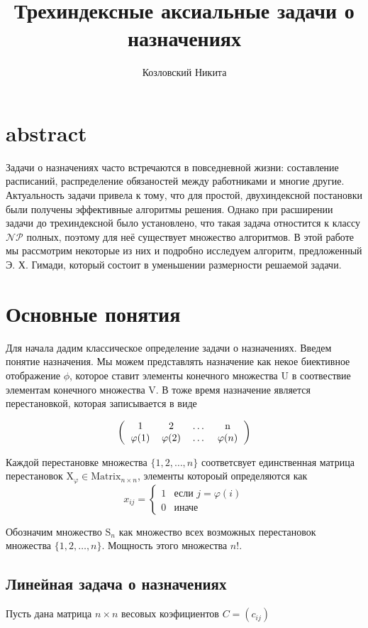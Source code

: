 \documentclass[10pt,a4paper]{article}
\author{Козловский Никита}
\title{Трехиндексные аксиальные задачи о назначениях}
\begin{document}
\section{abstract}
Задачи о назначениях часто встречаются в повседневной жизни: составление расписаний, 
распределение обязаностей между работниками и многие другие. Актуальность задачи
привела к тому, что для простой, двухиндексной постановки были получены эффективные 
алгоритмы решения. Однако при расширении задачи до трехиндексной было установлено, что
такая задача отностится к классу $\mathcal{NP}$ полных, поэтому для неё существует множество
алгоритмов. В этой работе мы рассмотрим некоторые из них и подробно исследуем алгоритм, предложенный
Э. Х. Гимади, который состоит в уменьшении размерности решаемой задачи.

\section{Основные понятия}
Для начала дадим классическое определение задачи о назначениях. 
Введем понятие назначения. Мы можем 
представлять назначение как некое биективное отображение $\phi$, которое ставит 
элементы конечного множества $\mathrm{U}$ в соотвествие элементам конечного 
множества $\mathrm{V}$. В тоже время назначение является перестановкой, которая записывается 
в виде 

\[ 
\left (
  \begin{tabular}{cccc}
  1 & 2 & \ldots & n\\
  $\varphi (1)$ & $\varphi (2)$ & \ldots & $\varphi (n)$
  \end{tabular}
\right )
\]

Каждой перестановке множества $\{1, 2, \ldots , n \}$ соответсвует единственная матрица 
перестановок $\mathrm{X}_\varphi \in \mathrm{Matrix}_{n \times n}$, элементы котороый определяются как 
\[
x_{ij} = 
 \begin{cases}
   1 & \text{если } j = \varphi(i) \\
   0 & \text{иначе}
 \end{cases}
\] 

Обозначим множество $\mathrm{S}_n$ как множество всех возможных перестановок множества 
 $\{1, 2, \ldots , n \}$. Мощность этого множества $n!$. 
 
\subsection{Линейная задача о назначениях}
Пусть дана матрица $n \times n$ весовых коэфициентов $C = (c_{ij})$
\end{document}

